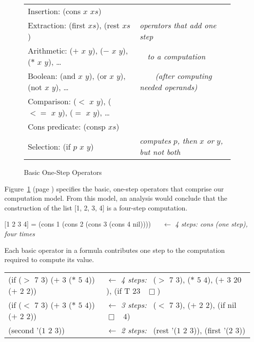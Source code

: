 \begin{figure}
\begin{center}
\begin{tabular}{ll}
Insertion: (cons $x$ $xs$)                                       & \\
Extraction: (first $xs$), (rest $xs$)                            & \emph{operators that add one step}           \\
Arithmetic: ($+$ $x$ $y$), ($-$ $x$ $y$), ($*$ $x$ $y$), \dots   & ~~\emph{to a computation}                    \\
Boolean: (and $x$ $y$), (or $x$ $y$), (not $x$ $y$), \dots       & ~~~~\emph{(after computing needed operands)} \\
Comparison: ($<$ $x$ $y$), ($<=$ $x$ $y$), ($=$ $x$ $y$), \dots  & \\
Cons predicate: (consp $xs$)                                     & \\
Selection: (if $p$ $x$ $y$)                                      & \emph{computes} $p$\emph{, then} $x$ \emph{or} $y$\emph{, but not both}
\end{tabular}
\end{center}
\caption{Basic One-Step Operators}
\label{fig:basic-one-step-ops}
\end{figure}

Figure~\ref{fig:basic-one-step-ops} (page \pageref{fig:basic-one-step-ops})
specifies the basic, one-step operators that comprise
our computation model.
From this model, an analysis would conclude
that the construction of the list [1, 2, 3, 4] is a
four-step computation.

\begin{center}
[1 2 3 4] = (cons 1 (cons 2 (cons 3 (cons 4 nil)))) ~~ $\leftarrow$ \emph{4 steps: cons (one step), four times}
\end{center}

Each basic operator in a formula contributes one step
to the computation required to compute its value.

\begin{center}
\begin{tabular}{ll}
    (if ($>$ $7$ $3$) ($+$ $3$ ($*$ $5$ $4$)) ($+$ $2$ $2$)) & $\leftarrow$ \emph{4 steps:}~ ($>$ $7$ $3$), ($*$ $5$ $4$), ($+$ $3$ $20$), (if T $23$ ~$\Box$) \\
    (if ($<$ $7$ $3$) ($+$ $3$ ($*$ $5$ $4$)) ($+$ $2$ $2$)) & $\leftarrow$ \emph{3 steps:}~ ($<$ $7$ $3$), ($+$ $2$ $2$), (if nil ~$\Box$~ $4$) \\
    (second '($1$ $2$ $3$))                                  & $\leftarrow$ \emph{2 steps:}~ (rest '($1$ $2$ $3$)), (first '($2$ $3$))
\end{tabular}
\end{center}

